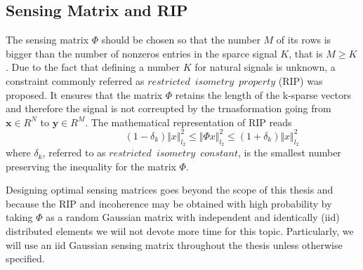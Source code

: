 \subsection{Sensing Matrix and RIP}
The sensing matrix $\Phi$ should be chosen so that the number $M$ of its rows is bigger than the number of nonzeros entries in the sparce signal $K$, that is $M \geq K$. Due to the fact that defining a number $K$ for natural signals is unknown, a constraint commonly referred as $restricted \enspace isometry \enspace property$ (RIP) \cite{candes2005decoding,candes2006stable,candes2008restricted} was proposed. It ensures that the matrix $\Phi$ retains the length of the k-sparse vectors and therefore the signal is not correupted  by the trnasformation going from $\mathbf{x} \in R^N $ to $\mathbf{y} \in R^M $. The mathematical representation of RIP reads
\begin{equation} \label{eq:rip1}
\hspace{3em} \hspace{3em} \hspace{3em} (1-\delta_k)\Vert x \Vert_{l_2}^2 \leq \Vert \Phi x \Vert_{l_2}^2 \leq (1+\delta_k)\Vert x \Vert_{l_2}^2  \hspace{3em}
\end{equation}  
where $\delta_k$, referred to as $restricted \enspace isometry \enspace constant$, is the smallest number preserving the inequality for the matrix $\Phi$. \

Designing optimal sensing matrices goes beyond the scope of this thesis and because the RIP and incoherence may be obtained with high probability by taking $\Phi$ as a random Gaussian matrix with independent and identically (iid) distributed elements\cite{baraniuk2007compressive} we wiil not devote more time for this topic. Particularly, we will use an iid Gaussian sensing matrix throughout the thesis unless otherwise specified.         


